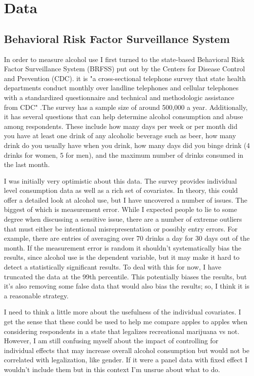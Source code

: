 \documentclass[11pt]{article}
\begin{document}
\section{Data}
\subsection{Behavioral Risk Factor Surveillance System}

In order to measure alcohol use I first turned to the state-based Behavioral Risk Factor Surveillance System (BRFSS) put out by the Centers for Disease Control and Prevention (CDC). it is "a cross-sectional telephone survey that state health departments conduct monthly over landline telephones and cellular telephones with a standardized questionnaire and technical and methodologic assistance from CDC" \cite{BRFSS_homepage}.The survey has a sample size of around 500,000 a year. Additionally, it has several questions that can help determine alcohol consumption and abuse among respondents. These include how many days per week or per month did you have at least one drink of any alcoholic beverage such as beer, how many drink do you usually have when you drink, how many days did you binge drink (4 drinks for women, 5 for men), and the maximum number of drinks consumed in the last month. \par

I was initially very optimistic about this data. The survey provides individual level consumption data as well as a rich set of covariates. In theory, this could offer a detailed look at alcohol use, but I have uncovered a number of issues. The biggest of which is measurement error. While I expected people to lie to some degree when discussing a sensitive issue, there are a number of extreme outliers that must either be intentional misrepresentation or possibly entry errors. For example, there are entries of averaging over 70 drinks a day for 30 days out of the month. If the measurement error is random it shouldn't systematically bias the results, since alcohol use is the dependent variable, but it may make it hard to detect a statistically significant results. To deal with this for now, I have truncated the data at the 99th percentile. This potentially biases the results, but it's also removing some false data that would also bias the results; so, I think it is a reasonable strategy.  \par

I need to think a little more about the usefulness of the individual covariates. I get the sense that these could be used to help me compare apples to apples when considering respondents in a state that legalizes recreational marijuana vs not. However, I am still confusing myself about the impact of controlling for individual effects that may increase overall alcohol consumption but would not be correlated with legalization, like gender. If it were a panel data with fixed effect I wouldn't include them but in this context I'm unsrue about what to do. \par
\end{document}

